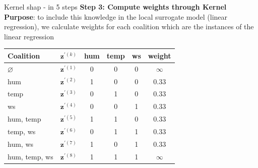 \documentclass[11pt,compress,t,notes=noshow, aspectratio=169, xcolor=table]{beamer}
\begin{document}
\begin{vbframe}{Kernel shap - in 5 steps}
\textbf{Step 3: Compute weights through Kernel}\\\medskip
\textbf{Purpose}: to include this knowledge in the local surrogate model (linear regression), we calculate weights for each coalition which are the instances of the linear regression

\begin{table}[]
    \centering
        \begin{tabular}{l |c|ccc|c}
 Coalition & $\mathbf{z}^{\prime (k)}$ &  hum & temp & ws & weight\\
  \hline 
  $\varnothing$ & $\mathbf{z}^{\prime (1)}$ & 0 & 0 & 0 & $\infty$ \\
  hum & $\mathbf{z}^{\prime (2)}$ & 1 & 0 & 0 & 0.33 \\
  temp &  $\mathbf{z}^{\prime (3)}$ & 0 & 1 & 0 & 0.33 \\
  ws &   $\mathbf{z}^{\prime (4)}$ & 0 & 0 & 1 & 0.33  \\
  hum, temp & $\mathbf{z}^{\prime (5)}$ & 1 & 1 & 0 & 0.33 \\
  temp, ws & $\mathbf{z}^{\prime (6)}$ & 0 & 1 & 1 & 0.33 \\
  hum, ws &   $\mathbf{z}^{\prime (7)}$ & 1 & 0 & 1 & 0.33 \\
  hum, temp, ws & $\mathbf{z}^{\prime (8)}$ & 1 & 1 & 1 & $\infty$ \\
  
 
  \end{tabular}
\end{table}
\medskip
{}

  
\end{vbframe}
\end{document}
